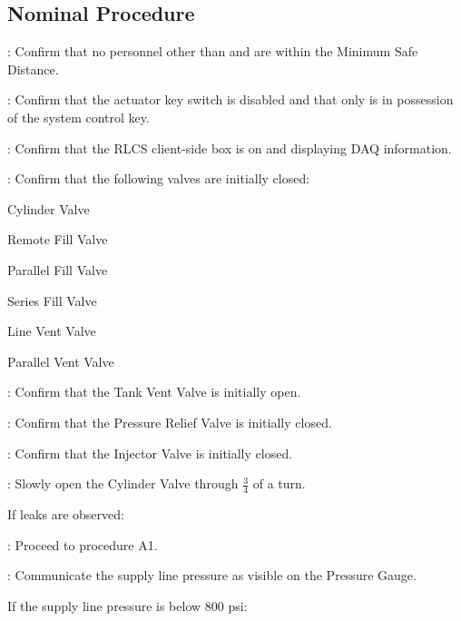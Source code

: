\subsection{Nominal Procedure}
\begin{checklist}
    \item \secondary: Confirm that no personnel other than \primary{} and \secondary{} are within the Minimum Safe Distance.
    \item \ops: Confirm that the actuator key switch is disabled and that only \ops{} is in possession of the system control  key.
    \item \control: Confirm that the RLCS client-side box is on and displaying DAQ information.
    \item \primary{}: Confirm that the following valves are initially closed:
    \begin{checklist}
        \item Cylinder Valve
        \item Remote Fill Valve
        \item Parallel Fill Valve
        \item Series Fill Valve
        \item Line Vent Valve
        \item Parallel Vent Valve
    \end{checklist}
    \item \ops{}: Confirm that the Tank Vent Valve is initially open.
    \item \ops{}: Confirm that the Pressure Relief Valve is initially closed.
    \item \ops{}: Confirm that the Injector Valve is initially closed.
    \item \primary: Slowly open the Cylinder Valve through $\frac{3}{4}$ of a turn.
    \begin{checklist}[label=$\bullet$]
        \item If leaks are observed:
        \begin{checklist}
            \item \ops{}: Proceed to procedure A1.
        \end{checklist}
    \end{checklist}
    \item \primary{}: Communicate the supply line pressure as visible on the Pressure Gauge.
    \begin{checklist}[label=$\bullet$]
        \item If the supply line pressure is below 800 psi:

\end{checklist}
\end{checklist}
